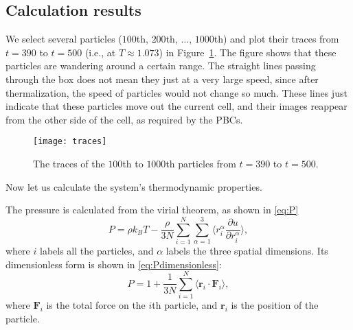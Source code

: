 \subsection{Calculation results}

We select several particles ($100$th, $200$th, $\ldots$, $1000$th) and plot their traces
from $t = 390$ to $t = 500$ (i.e., at $T \approx 1.073$) in Figure~\ref{fig:traces}.
The figure shows that these particles are wandering around a certain
range. The straight lines passing through the box does not mean they just at a very
large speed, since after thermalization, the speed of particles would not change so
much. These lines just indicate that these particles move out the current cell,
and their images reappear from the other side of the cell, as required by the PBCs.

\begin{figure}
    \centering
    \texttt{[image: traces]}
    \caption{The traces of the $100$th to $1000$th particles from $t = 390$ to $t = 500$.}
    \label{fig:traces}
\end{figure}

Now let us calculate the  system's thermodynamic properties.

The pressure is calculated from the virial theorem, as shown in \eqref{eq:P}
%
\begin{equation}\label{eq:P}
    P = \rho k_B T - \frac{ \rho }{ 3N } \sum_{i=1}^{N} \sum_{\alpha=1}^{3}
    \biggl \langle r_i^\alpha \frac{ \partial u }{ \partial r_i^\alpha } \biggr \rangle,
\end{equation}
%
where $i$ labels all the particles, and $\alpha$ labels the three spatial dimensions.
Its dimensionless form is shown in \eqref{eq:Pdimensionless}\cite{thijssen_2007}:
%
\begin{equation}\label{eq:Pdimensionless}
    P = 1 + \frac{ 1 }{ 3N } \sum_{i=1}^{N}
    \langle \bm{r}_i \cdot \bm{F}_i \rangle,
\end{equation}
%
where $\bm{F}_i$ is the total force on the $i$th particle, and $\bm{r}_i$ is the
position of the particle.
